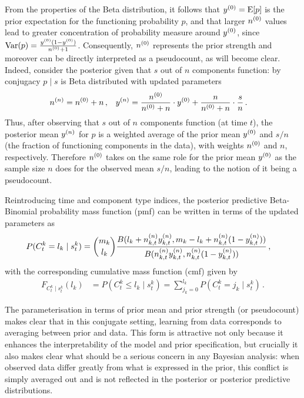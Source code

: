 \documentclass[12pt, a4paper]{elsarticle}
\newcommand{\bs}[1]{\boldsymbol{#1}}
\renewcommand{\vec}[1]{{\bs#1}}
\newcommand{\E}{\operatorname{E}}
\newcommand{\V}{\operatorname{Var}}
\begin{document}
From the properties of the Beta distribution,
it follows that $\yz = \E[p]$ is the prior expectation for the functioning probability $p$,
and that larger $n^{(0)}$ values lead to greater concentration of probability measure around $y^{(0)}$,
since $\V(p) = \frac{\yz (1-\yz)}{\nz + 1}$.
Consequently, $n^{(0)}$ represents the prior strength and moreover can be directly interpreted as a pseudocount, as will become clear.
Indeed, consider the posterior given that $s$ out of $n$ components function:
by conjugacy
$p \mid s$ is Beta distributed with updated parameters
\begin{align}
n^{(n)} &= n^{(0)} + n\,, &
y^{(n)} &= \frac{n^{(0)}}{n^{(0)} + n} \cdot y^{(0)} + \frac{n}{n^{(0)} + n} \cdot \frac{s}{n}\,.
\label{eq:nyupdate}
\end{align}
Thus, after observing that $s$ out of $n$ components function (at time $t$),
the posterior mean $y^{(n)}$ for $p$ is a weighted average of
the prior mean $y^{(0)}$ and $s/n$ (the fraction of functioning components in the data),
with weights $n^{(0)}$ and $n$, respectively.
Therefore $n^{(0)}$ takes on the same role for the prior mean $y^{(0)}$
as the sample size $n$ does for the observed mean $s/n$,
leading to the notion of it being a pseudocount.

Reintroducing time and component type indices, the posterior predictive Beta-Binomial probability mass function (pmf) can be written in terms of the updated parameters as
\begin{align}
P(C^k_t = l_k \mid s^k_t) &= {m_k \choose l_k} \frac{B(l_k + n^{(n)}_{k,t}y^{(n)}_{k,t}, m_k - l_k + n^{(n)}_{k,t}(1-y^{(n)}_{k,t}))}
                                                    {B(n^{(n)}_{k,t}y^{(n)}_{k,t}, n^{(n)}_{k,t}(1-y^{(n)}_{k,t}))} \,,
\label{eq:postpredCny}
\end{align}
with the corresponding cumulative mass function (cmf) given by
\begin{align}
F_{C^k_t\mid s^k_t}(l_k) &= P(C^k_t \le l_k \mid s^k_t) = \sum_{j_k=0}^{l_k} P(C^k_t = j_k \mid s^k_t)\,.
\label{eq:postpredCnycmf}
\end{align}


The parameterisation in terms of prior mean and prior strength (or pseudocount)
makes clear that in this conjugate setting,
learning from data corresponds to averaging between prior and data.
This form is attractive not only because it enhances the interpretability of the model and prior specification,
but crucially it also makes clear what should be a serious concern in any Bayesian analysis:
when observed data differ greatly from what is expressed in the prior,
this conflict is simply averaged out
and is not reflected in the posterior or posterior predictive distributions.
\end{document}
